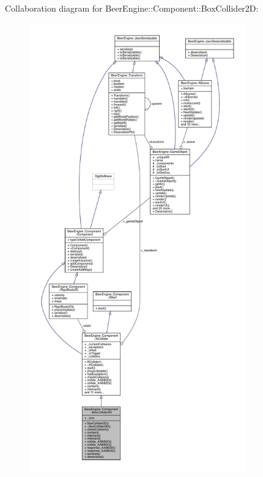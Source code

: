 Collaboration diagram for Beer\+Engine\+:\+:Component\+:\+:Box\+Collider2D\+:\nopagebreak
\begin{figure}[H]
\begin{center}
\leavevmode
\includegraphics[height=550pt]{class_beer_engine_1_1_component_1_1_box_collider2_d__coll__graph}
\end{center}
\end{figure}
